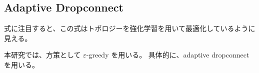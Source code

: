 \subsection{Adaptive Dropconnect}
式に注目すると、この式はトポロジーを強化学習を用いて最適化しているように見える。

本研究では、方策として $\varepsilon$-greedy を用いる。
具体的に、adaptive dropconnectを用いる。

